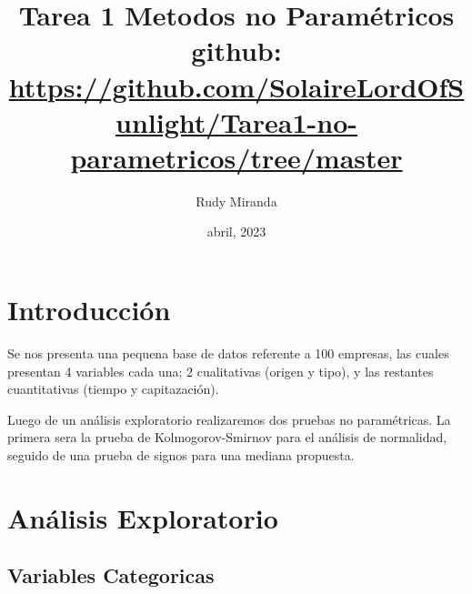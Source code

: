 \documentclass{article}
\title{Tarea 1 Metodos no Param\'etricos \\
\small github: \url{https://github.com/SolaireLordOfSunlight/Tarea1-no-parametricos/tree/master}}
\author{Rudy Miranda}
\date{abril, 2023}
\begin{document}
    \maketitle
    \tableofcontents

    \section{Introducci\'on}

    Se nos presenta una pequena base de datos referente a 100 empresas, las cuales presentan 4 variables cada una; 2 cualitativas (origen y tipo), y las restantes cuantitativas (tiempo y capitazaci\'on).

    Luego de un an\'alisis exploratorio realizaremos dos pruebas no param\'etricas. La primera sera la prueba de Kolmogorov-Smirnov para el an\'alisis de normalidad, seguido de una prueba de signos para una mediana propuesta.
    
    \section{An\'alisis Exploratorio}

    \subsection{Variables Categoricas}
    
\end{document}
